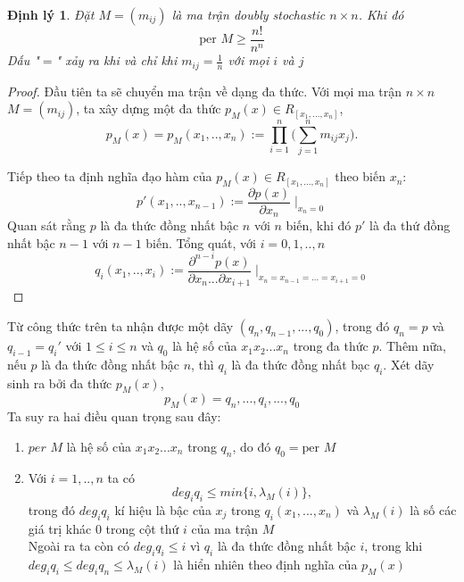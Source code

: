 \documentclass[a4paper, 12pt]{report}
\newtheorem*{theorem}{Định lý } %
\begin{document}
\begin{theorem}
Đặt $M=(m_{ij})$ là ma trận \textit{doubly stochastic} $n \times n $. Khi đó
\begin{equation*}
\textrm{per } M \geq \frac{n!}{n^n}
\end{equation*}
Dấu "$=$" xảy ra khi và chỉ khi  $m_{ij} = \frac{1}{n}$ với mọi $i$ và $j$
\end{theorem}
\begin{proof}
Đầu tiên ta sẽ chuyển ma trận về dạng đa thức. Với mọi ma trận $n  \times n$ $M = (m_{ij}) $, ta xây dựng một đa thức $p_M(x) \in R_{[x_1,...,x_n]} $, 
\begin{equation*}
	p_M(x) = p_M(x_1,..,x_n) := \displaystyle \prod_{i=1}^{n} \Big( \displaystyle \sum_{j=1}^{n} m_{ij}x_j \Big).
\end{equation*}

Tiếp theo ta định nghĩa đạo hàm của $p_M(x) \in R_{[x_1,...,x_n]} $  theo biến $x_n$:
\begin{equation*}
	 p'(x_1,..,x_{n-1}) := \frac{\partial p(x)}{\partial x_n}\mid _{x_n = 0}
\end{equation*}
Quan sát rằng $p$ là đa thức đồng nhất bậc $n$ với $n$ biến, khi đó $p'$ là đa thứ đồng nhất bậc $n-1$ với $n-1$ biến. Tổng quát, với $i=0,1,..,n$
\begin{equation*}
	 q_i(x_1,..,x_{i}) := \frac{\partial^{n-i} p(x)}{\partial x_n...\partial x_{i+1}}\mid _{x_n = x_{n-1} = ... = x_{i+1} = 0}
\end{equation*}
\end{proof}
Từ công thức trên ta nhận được một dãy $(q_n,q_{n-1},...,q_0)$, trong đó $q_n=p$ và $q_{i-1} = q_{i}'$ với $1 \leq i \leq n$ và $q_0$ là hệ số của $x_1x_2...x_n$ trong đa thức $p$. Thêm nữa, nếu $p$ là đa thức đồng nhất bậc $n$, thì $q_i$ là đa thức đồng nhất bạc $q_i$. Xét dãy sinh ra bởi đa thức $p_M(x)$,
\begin{equation*}
p_M(x) = q_n,...,q_i,...,q_0
\end{equation*}
Ta suy ra hai điều quan trọng sau đây: 
\begin{enumerate}[label=\textbf{\Alph*.}]
\item $per$ $M$ là hệ số của $x_1x_2...x_n$ trong $q_n$, do đó $q_0 = \textrm{per }M$
\item Với  $i=1,..,n$ ta có
\begin{equation*}
	deg_{i}q_i \leq min\{i,\lambda_M(i)\},
\end{equation*}
trong đó $deg_{i}q_i $ kí hiệu là bậc của $x_{j}$ trong $q_i(x_1,...,x_n)$ và $\lambda_M(i)$ là số các giá trị khác 0 trong cột thứ $i$ của ma trận $M$ \\
Ngoài ra ta còn có $deg_{i}q_i \leq i$ vì $q_i$ là đa thức đồng nhất bậc $i$, trong khi $deg_{i}q_i \leq deg_{i}q_n \leq \lambda_M(i)$ là hiển nhiên theo định nghĩa của $p_M(x)$
\end{enumerate}
\end{document}
